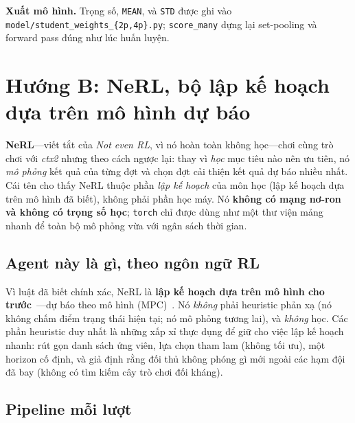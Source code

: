 \documentclass[conference]{IEEEtran}
\begin{document}
\textbf{Xuất mô hình.} Trọng số, \texttt{MEAN}, và \texttt{STD} được ghi vào \texttt{model/student\_weights\_\{2p,4p\}.py}; \texttt{score\_many} dựng lại set-pooling và forward pass đúng như lúc huấn luyện.

\section{Hướng B: NeRL, bộ lập kế hoạch dựa trên mô hình dự báo}
\label{sec:planner}

\textbf{NeRL}---viết tắt của \emph{Not even RL}, vì nó hoàn toàn không học---chơi cùng trò chơi với \textit{ctx2} nhưng theo cách ngược lại: thay vì \emph{học} mục tiêu nào nên ưu tiên, nó \emph{mô phỏng} kết quả của từng đợt và chọn đợt cải thiện kết quả dự báo nhiều nhất. Cái tên cho thấy NeRL thuộc phần \emph{lập kế hoạch} của môn học (lập kế hoạch dựa trên mô hình đã biết), không phải phần học máy. Nó \textbf{không có mạng nơ-ron và không có trọng số học}; \texttt{torch} chỉ được dùng như một thư viện mảng nhanh để toàn bộ mô phỏng vừa với ngân sách thời gian.

\subsection{Agent này là gì, theo ngôn ngữ RL}

Vì luật đã biết chính xác, NeRL là \textbf{lập kế hoạch dựa trên mô hình cho trước}~\cite{suttonbarto}---dự báo theo mô hình (MPC)~\cite{mpc1989}. Nó \emph{không} phải heuristic phản xạ (nó không chấm điểm trạng thái hiện tại; nó mô phỏng tương lai), và \emph{không} học. Các phần heuristic duy nhất là những xấp xỉ thực dụng để giữ cho việc lập kế hoạch nhanh: rút gọn danh sách ứng viên, lựa chọn tham lam (không tối ưu), một horizon cố định, và giả định rằng đối thủ không phóng gì mới ngoài các hạm đội đã bay (không có tìm kiếm cây trò chơi đối kháng).

\subsection{Pipeline mỗi lượt}
\end{document}
